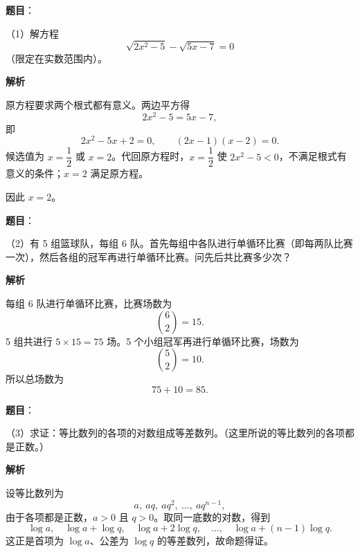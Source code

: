 


\begin{answer}

\textbf{题目}：

（1）解方程
\[
\sqrt{2x^2-5}-\sqrt{5x-7}=0
\]
（限定在实数范围内）。

\textbf{解析}

原方程要求两个根式都有意义。两边平方得
\[
2x^2-5=5x-7,
\]
即
\[
2x^2-5x+2=0,
\qquad (2x-1)(x-2)=0.
\]
候选值为 $x=\dfrac12$ 或 $x=2$。代回原方程时，$x=\dfrac12$ 使 $2x^2-5<0$，不满足根式有意义的条件；$x=2$ 满足原方程。

因此 $x=2$。


\end{answer}
\begin{answer}

\textbf{题目}：

（2）有 5 组篮球队，每组 6 队。首先每组中各队进行单循环比赛（即每两队比赛一次），然后各组的冠军再进行单循环比赛。问先后共比赛多少次？

\textbf{解析}

每组 6 队进行单循环比赛，比赛场数为
\[
\binom62=15.
\]
5 组共进行 $5\times15=75$ 场。5 个小组冠军再进行单循环比赛，场数为
\[
\binom52=10.
\]
所以总场数为
\[
75+10=85.
\]


\end{answer}
\begin{answer}

\textbf{题目}：

（3）求证：等比数列的各项的对数组成等差数列。（这里所说的等比数列的各项都是正数。）

\textbf{解析}

设等比数列为
\[
a,\ aq,\ aq^2,\ \ldots,\ aq^{n-1},
\]
由于各项都是正数，$a>0$ 且 $q>0$。取同一底数的对数，得到
\[
\log a,\quad \log a+\log q,\quad \log a+2\log q,\quad\ldots,\quad
\log a+(n-1)\log q.
\]
这正是首项为 $\log a$、公差为 $\log q$ 的等差数列，故命题得证。


\end{answer}
